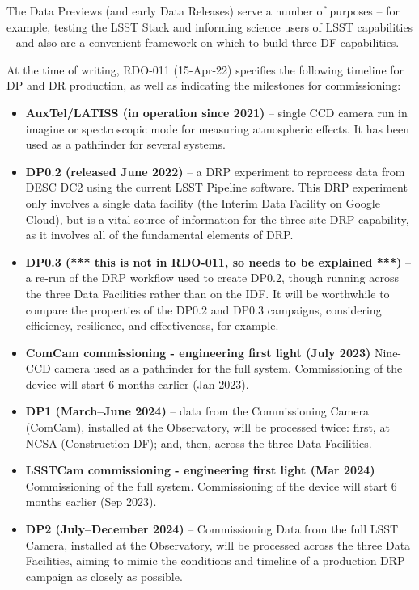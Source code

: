 The Data Previews (and early Data Releases) serve a number of purposes -- for example, testing the LSST Stack and informing science users of LSST capabilities -- and also are a convenient framework on which to build three-DF capabilities.

At the time of writing, RDO-011 (15-Apr-22) specifies the following
timeline for DP and DR production, as well as indicating the
milestones for commissioning:

\begin{itemize}

\item {\bf AuxTel/LATISS (in operation since 2021)} -- single CCD
  camera run in imagine or spectroscopic mode for measuring
  atmospheric effects. It has been used as a pathfinder for several systems.
  
\item {\bf DP0.2 (released June 2022)} -- a DRP experiment to reprocess data from DESC DC2 using the current LSST Pipeline software. This DRP experiment only involves a single data facility (the Interim Data Facility on Google Cloud), but is a vital source of information for the three-site DRP capability, as it involves all of the fundamental elements of DRP.
  
\item {\bf DP0.3 (*** this is not in RDO-011, so needs to be explained ***)} -- a re-run of the DRP workflow used to create DP0.2, though running across the three Data Facilities rather than on the IDF. It will be worthwhile to compare the properties of the DP0.2 and DP0.3 campaigns, considering efficiency, resilience, and effectiveness, for example.

\item{\bf ComCam commissioning - engineering first light (July 2023)}
  Nine-CCD camera used as a pathfinder for the full
  system. Commissioning of the device will start 6 months earlier (Jan 2023).
  
\item {\bf DP1 (March--June 2024)} -- data from the Commissioning Camera (ComCam), installed at the Observatory, will be processed twice: first, at NCSA (Construction DF); and, then, across the three Data Facilities.

 \item{\bf LSSTCam commissioning - engineering first light (Mar 2024)}
 Commissioning of the full
  system. Commissioning of the device will start 6 months earlier (Sep
  2023).
  
\item {\bf DP2 (July--December 2024)} – Commissioning Data from the full LSST Camera, installed at the Observatory, will be processed across the three Data Facilities, aiming to mimic the conditions and timeline of a production DRP campaign as closely as possible.


\end{itemize}
